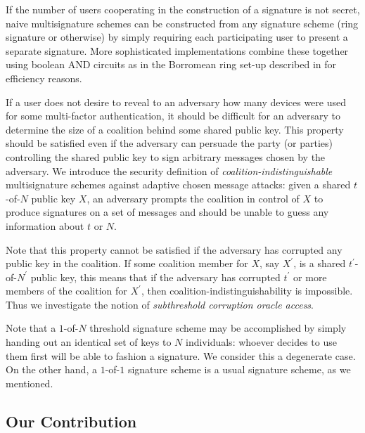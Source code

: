 \documentclass[12pt,english,oneside]{mrl}
\theoremstyle{definition}
\numberwithin{equation}{section}
\numberwithin{figure}{section}
\numberwithin{equation}{section}
\numberwithin{equation}{section}
\numberwithin{figure}{section}
\begin{document}
If the number of users cooperating in the construction of a signature is not secret, naive multisignature schemes can be constructed from any signature scheme (ring signature or otherwise) by simply requiring each participating user to present a separate signature. More sophisticated implementations combine these together using boolean AND circuits as in the Borromean ring set-up described in \cite{} for efficiency reasons. 

If a user does not desire to reveal to an adversary how many devices were used for some multi-factor authentication, it should be difficult for an adversary to determine the size of a coalition behind some shared public key. This property should be satisfied even if the adversary can persuade the party (or parties) controlling the shared public key to sign arbitrary messages chosen by the adversary. We introduce the security definition of \textit{coalition-indistinguishable} multisignature schemes against adaptive chosen message attacks: given a shared $t$-of-$N$ public key $X$, an adversary prompts the coalition in control of $X$ to produce signatures on a set of messages and should be unable to guess any information about $t$ or $N$.

Note that this property cannot be satisfied if the adversary has corrupted any public key in the coalition. If some coalition member for $X$, say $X^{\prime}$, is a shared $t^{\prime}$-of-$N^{\prime}$ public key, this means that if the adversary has corrupted $t^{\prime}$ or more members of the coalition for $X^{\prime}$, then coalition-indistinguishability is impossible. Thus we investigate the notion of \textit{subthreshold corruption oracle access}.

Note that a $1$-of-$N$ threshold signature scheme may be accomplished by simply handing out an identical set of keys to $N$ individuals: whoever decides to use them first will be able to fashion a signature. We consider this a degenerate case. On the other hand, a $1$-of-$1$ signature scheme is a usual signature scheme, as we mentioned. %



\subsection{Our Contribution}
\end{document}

